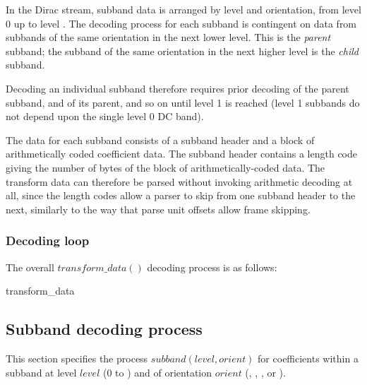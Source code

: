 In the Dirac stream, subband data is arranged by level and orientation, from
level 0 up to level \TransformDepth. The decoding process for each subband is
contingent on data from subbands of the same orientation in the next lower level.
This is the {\em parent} subband; the subband of the same orientation in the next
higher level is the {\em child} subband. 

Decoding an individual subband therefore requires prior decoding of the parent subband,
and of its parent, and so on until level 1 is reached (level 1 subbands do not depend
upon the single level 0 DC band).

\begin{informative}
The data for each subband consists of a subband header and a block of arithmetically
coded coefficient data. The subband header contains a length code giving the number of
bytes of the block of arithmetically-coded data. The transform data can therefore be
parsed without invoking arithmetic decoding at all, since the length codes allow a 
parser to skip from one subband header to the next, similarly to the way that parse unit
offsets allow frame skipping.
\end{informative}

\subsubsection{Decoding loop}

The overall $transform\_data()$ decoding process is as follows:

\begin{pseudo}{transform\_data}{}
  \bsEND
\bsEND
{}
\end{pseudo}

\subsection{Subband decoding process}

\label{subbanddecodeprocess}

This section specifies the process $subband(level,orient)$ for coefficients
within a subband at level $level$ ($0$ to \TransformDepth) and of orientation $orient$
(\LL, \LH, \HL, or \HH). 


